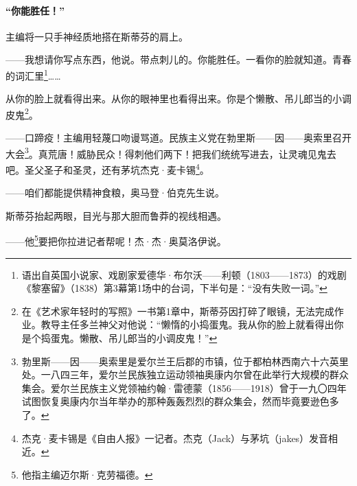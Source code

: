 \paragraph*{“你能胜任！”}
\par 主编将一只手神经质地搭在斯蒂芬的肩上。
\par ——我想请你写点东西，他说。带点刺儿的。你能胜任。一看你的脸就知道。青春的词汇里\footnote{语出自英国小说家、戏剧家爱德华·布尔沃——利顿（1803——1873）的戏剧《黎塞留》（1838）第3幕第1场中的台词，下半句是：“没有失败一词。”}……
\par 从你的脸上就看得出来。从你的眼神里也看得出来。你是个懒散、吊儿郎当的小调皮鬼\footnote{在《艺术家年轻时的写照》一书第1章中，斯蒂芬因打碎了眼镜，无法完成作业。教导主任多兰神父对他说：“懒惰的小捣蛋鬼。我从你的脸上就看得出你是个捣蛋鬼。懒散、吊儿郎当的小调皮鬼！”}。
\par ——口蹄疫！主编用轻蔑口吻谩骂道。民族主义党在勃里斯——因——奥索里召开大会\footnote{勃里斯——因——奥索里是爱尔兰王后郡的市镇，位于都柏林西南六十六英里处。一八四三年，爱尔兰民族独立运动领袖奥康内尔曾在此举行大规模的群众集会。爱尔兰民族主义党领袖约翰·雷德蒙（1856——1918）曾于一九〇四年试图恢复奥康内尔当年举办的那种轰轰烈烈的群众集会，然而毕竟要逊色多了。}。真荒唐！威胁民众！得刺他们两下！把我们统统写进去，让灵魂见鬼去吧。圣父圣子和圣灵，还有茅坑杰克·麦卡锡\footnote{杰克·麦卡锡是《自由人报》一记者。杰克（Jack）与茅坑（jakes）发音相近。}。
\par ——咱们都能提供精神食粮，奥马登·伯克先生说。
\par 斯蒂芬抬起两眼，目光与那大胆而鲁莽的视线相遇。
\par ——他\footnote{他指主编迈尔斯·克劳福德。}要把你拉进记者帮呢！杰·杰·奥莫洛伊说。
